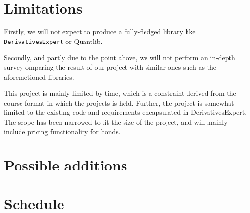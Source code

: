 \documentclass[11pt]{article}
\begin{document}
\section*{Limitations}

Firstly, we will not expect to produce a fully-fledged library like {\tt DerivativesExpert} or Quantlib\cite{Ame2003}.

Secondly, and partly due to the point above, we will not perform an in-depth survey
omparing the result of our project with similar ones such as the aforemetioned libraries.


This project is mainly limited by time, which is a constraint derived from the course format in which the projects is held.
Further, the project is somewhat limited to the existing code and requirements encapsulated in DerivativesExpert.
The scope has been narrowed to fit the size of the project, and will mainly include pricing functionality for bonds.

\section*{Possible additions}

\section*{Schedule}



\end{document}

